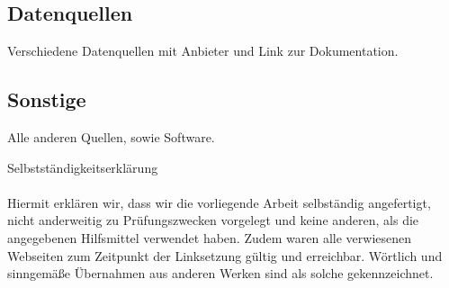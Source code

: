 \documentclass[a4paper,oneside,10pt,titlepage]{article}
\begin{document}
\subsection{Datenquellen}
Verschiedene Datenquellen mit Anbieter und Link zur Dokumentation.
\subsection{Sonstige}
Alle anderen Quellen, sowie Software.

\newpage
\Large{Selbstständigkeitserklärung}\\
\\
\small Hiermit erklären wir, dass wir die vorliegende Arbeit selbständig angefertigt, nicht anderweitig zu Prüfungszwecken vorgelegt und keine anderen, als die angegebenen Hilfsmittel verwendet haben. Zudem waren alle verwiesenen Webseiten zum Zeitpunkt der Linksetzung gültig und erreichbar. Wörtlich und sinngemäße Übernahmen aus anderen Werken sind als solche gekennzeichnet.
\\
\end{document}
